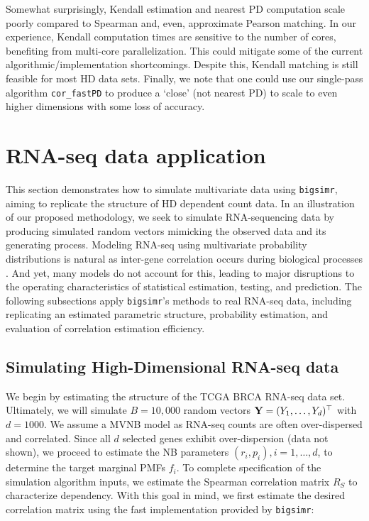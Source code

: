 \documentclass[
]{jss}
\begin{document}
Somewhat surprisingly, Kendall estimation and nearest PD computation scale poorly compared to Spearman and, even, approximate Pearson matching. In our experience, Kendall computation times are sensitive to the number of cores, benefiting from multi-core parallelization. This could mitigate some of the current algorithmic/implementation shortcomings. Despite this, Kendall matching is still feasible for most HD data sets. Finally, we note that one could use our single-pass algorithm \texttt{cor\_fastPD} to produce a `close' (not nearest PD) to scale to even higher dimensions with some loss of accuracy.

\hypertarget{examples}{%
\section{RNA-seq data application}\label{examples}}

This section demonstrates how to simulate multivariate data using \texttt{bigsimr}, aiming to replicate the structure of HD dependent count data. In an illustration of our proposed methodology, we seek to simulate RNA-sequencing data by producing simulated random vectors mimicking the observed data and its generating process. Modeling RNA-seq using multivariate probability distributions is natural as inter-gene correlation occurs during biological processes \citep{Wang2009b}. And yet, many models do not account for this, leading to major disruptions to the operating characteristics of statistical estimation, testing, and prediction. The following subsections apply \texttt{bigsimr}'s methods to real RNA-seq data, including replicating an estimated parametric structure, probability estimation, and evaluation of correlation estimation efficiency.

\hypertarget{simulating-high-dimensional-rna-seq-data}{%
\subsection{Simulating High-Dimensional RNA-seq data}\label{simulating-high-dimensional-rna-seq-data}}

We begin by estimating the structure of the TCGA BRCA RNA-seq data set. Ultimately, we will simulate \(B=10,000\) random vectors \({\bf Y}=(Y_1, \ldots, Y_d)^\top\) with \(d=1000\). We assume a MVNB model as RNA-seq counts are often over-dispersed and correlated. Since all \(d\) selected genes exhibit over-dispersion (data not shown), we proceed to estimate the NB parameters \((r_i, p_i), i=1,\ldots,d\), to determine the target marginal PMFs \(f_i\). To complete specification of the simulation algorithm inputs, we estimate the Spearman correlation matrix \(R_S\) to characterize dependency. With this goal in mind, we first estimate the desired correlation matrix using the fast implementation provided by \texttt{bigsimr}:
\end{document}
